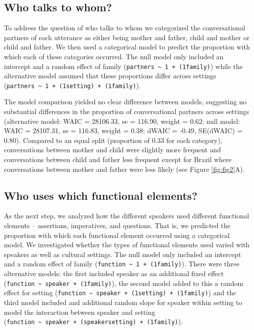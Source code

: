 \documentclass[
  man,floatsintext]{apa6}
\begin{document}
\hypertarget{who-talks-to-whom}{%
\subsection{Who talks to whom?}\label{who-talks-to-whom}}

To address the question of who talks to whom we categorized the conversational partners of each utterance as either being mother and father, child and mother or child and father. We then used a categorical model to predict the proportion with which each of these categories occurred. The null model only included an intercept and a random effect of family (\texttt{partners\ \textasciitilde{}\ 1\ +\ (1\textbar{}family)}) while the alternative model assumed that these proportions differ across settings (\texttt{partners\ \textasciitilde{}\ 1\ +\ (1\textbar{}setting)\ +\ (1\textbar{}family)}).

The model comparison yielded no clear difference between models, suggesting no substantial differences in the proportion of conversational partners across settings (alternative model: WAIC = 28106.33, se = 116.90, weight = 0.62; null model: WAIC = 28107.31, se = 116.83, weight = 0.38; dWAIC = -0.49, SE(dWAIC) = 0.80). Compared to an equal split (proportion of 0.33 for each category), conversations between mother and child were slightly more frequent and conversations between child and father less frequent except for Brazil where conversations between mother and father were less likely (see Figure \ref{fig:fig2}A).

\hypertarget{who-uses-which-functional-elements}{%
\subsection{Who uses which functional elements?}\label{who-uses-which-functional-elements}}

As the next step, we analyzed how the different speakers used different functional elements -- assertions, imperatives, and questions. That is, we predicted the proportion with which each functional element occurred using a categorical model. We investigated whether the types of functional elements used varied with speakers as well as cultural settings. The null model only included an intercept and a random effect of family (\texttt{function\ \textasciitilde{}\ 1\ +\ (1\textbar{}family)}). There were three alternative models: the first included speaker as an additional fixed effect (\texttt{function\ \textasciitilde{}\ speaker\ +\ (1\textbar{}family)}), the second model added to this a random effect for setting (\texttt{function\ \textasciitilde{}\ speaker\ +\ (1\textbar{}setting)\ +\ (1\textbar{}family)}) and the third model included and additional random slope for speaker within setting to model the interaction between speaker and setting (\texttt{function\ \textasciitilde{}\ speaker\ +\ (speaker\textbar{}setting)\ +\ (1\textbar{}family)}).
\end{document}
